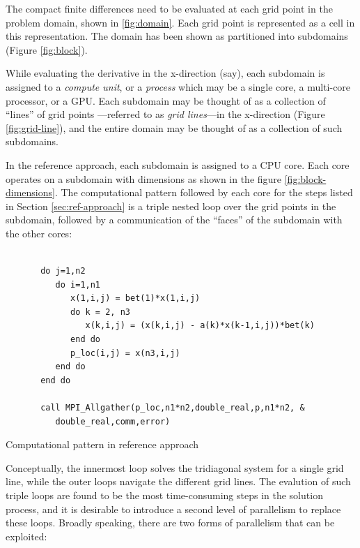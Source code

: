 \documentclass{article}
\begin{document}
    \pagebreak

    The compact finite differences need to be evaluated
    at each grid point in the problem domain,
    shown in \ref{fig:domain}.
    Each grid point is represented as a cell in this representation.
    The domain has been shown as partitioned into subdomains (Figure \ref{fig:block}).

    While evaluating the derivative in the x-direction (say),
    each subdomain is assigned to a \emph{compute unit}, or a \emph{process}
    which may be a single core, a multi-core processor, or a GPU.
    Each subdomain may be thought of as a collection of ``lines'' of grid points
    ---referred to as \emph{grid lines}---in the x-direction (Figure \ref{fig:grid-line}),
    and the entire domain may be thought of as a collection of such subdomains.

    In the reference approach, each subdomain is assigned to a CPU core.
    Each core operates on a subdomain with dimensions as shown
    in the figure \ref{fig:block-dimensions}.
    The computational pattern followed by each core for the steps listed in Section
    \ref{sec:ref-approach}
    is a triple nested loop over the grid points in the subdomain,
    followed by a communication of the ``faces'' of the subdomain with the other
    cores:

    \begin{listing}
    \begin{verbatim}

       do j=1,n2
          do i=1,n1
             x(1,i,j) = bet(1)*x(1,i,j)
             do k = 2, n3
                x(k,i,j) = (x(k,i,j) - a(k)*x(k-1,i,j))*bet(k)
             end do
             p_loc(i,j) = x(n3,i,j)
          end do
       end do

       call MPI_Allgather(p_loc,n1*n2,double_real,p,n1*n2, &
          double_real,comm,error)

    \end{verbatim}
    \caption{Computational pattern in reference approach}
    \label{listing:triple-loop}
    \end{listing}

    Conceptually, the innermost loop solves the tridiagonal system
    for a single grid line,
    while the outer loops navigate the different grid lines.
    The evalution of such triple loops are found to be the most time-consuming steps
    in the solution process,
    and it is desirable to introduce a second level of parallelism to replace these loops.
    Broadly speaking, there are two forms of parallelism that can be exploited:
\end{document}
